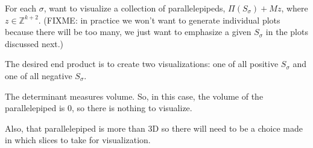 \documentclass[
  letterpaper,
  DIV=11,
  numbers=noendperiod]{scrreprt}
\begin{document}
For each \(\sigma\), want to visualize a collection of parallelepipeds,
\(\Pi \left ( S_\sigma\right ) + Mz\), where \(z \in \mathbb{Z}^{k+2}\).
(FIXME: in practice we won't want to generate individual plots because
there will be too many, we just want to emphasize a given \(S_\sigma\)
in the plots discussed next.)

The desired end product is to create two visualizations: one of all
positive \(S_\sigma\) and one of all negative \(S_\sigma\).

\begin{tcolorbox}[enhanced jigsaw, titlerule=0mm, arc=.35mm, coltitle=black, left=2mm, colframe=quarto-callout-note-color-frame, opacitybacktitle=0.6, bottomrule=.15mm, rightrule=.15mm, breakable, leftrule=.75mm, title=\textcolor{quarto-callout-note-color}{\faInfo}\hspace{0.5em}{What about \(det(S_\sigma) = 0\)?}, bottomtitle=1mm, toptitle=1mm, toprule=.15mm, colback=white, opacityback=0, colbacktitle=quarto-callout-note-color!10!white]

The determinant measures volume. So, in this case, the volume of the
parallelepiped is 0, so there is nothing to visualize.

\end{tcolorbox}

Also, that parallelepiped is more than 3D so there will need to be a
choice made in which slices to take for visualization.
\end{document}
